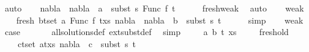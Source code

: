 \begin{isabellebody}
\ auto\isanewline
\ \ \isamarkupfalse%
\ {\isachardoublequoteopen}{\isacharparenleft}{\kern0pt}nabla{}\ {\isasymunion}\ nabla{}{\isacharparenright}{\kern0pt}\ {\isasymturnstile}\ a\ {\isasymsharp}\ subst\ s{}\ {\isacharparenleft}{\kern0pt}Func\ f\ t{\isacharprime}{\kern0pt}{\isacharparenright}{\kern0pt}{\isachardoublequoteclose}\isanewline
\ \ \ \ \isamarkupfalse%
\ fresh{\isacharunderscore}{\kern0pt}weak\ \isamarkupfalse%
\ auto\isanewline
\ \ \isamarkupfalse%
\ weak{}\isanewline
\ \ \isamarkupfalse%
\ fresh{\isacharcolon}{\kern0pt}\ {\isachardoublequoteopen}{\isasymforall}{\isacharparenleft}{\kern0pt}b{\isacharcomma}{\kern0pt}t{\isacharparenright}{\kern0pt}{\isasymin}set\ {\isacharparenleft}{\kern0pt}{\isacharparenleft}{\kern0pt}a{\isacharcomma}{\kern0pt}\ Func\ f\ t{\isacharprime}{\kern0pt}{\isacharparenright}{\kern0pt}{\isacharhash}{\kern0pt}xs{\isacharparenright}{\kern0pt}{\isachardot}{\kern0pt}\ {\isacharparenleft}{\kern0pt}nabla{}\ {\isasymunion}\ nabla{}{\isacharparenright}{\kern0pt}\ {\isasymturnstile}\ b\ {\isasymsharp}\ subst\ s{}\ t{\isachardoublequoteclose}\isanewline
\ \ \ \ \isamarkupfalse%
\ simp\isanewline
\ \ \isamarkupfalse%
\ weak{}{\isacharparenleft}{\kern0pt}{}{\isacharparenright}{\kern0pt}\ \isamarkupfalse%
\ {\isacharquery}{\kern0pt}case\ \isanewline
\ \ \ \ \isamarkupfalse%
\ all{\isacharunderscore}{\kern0pt}solutions{\isacharunderscore}{\kern0pt}def\ ext{\isacharunderscore}{\kern0pt}subst{\isacharunderscore}{\kern0pt}def\ \isamarkupfalse%
\ simp\isanewline
{}\isamarkupfalse%
\isanewline
\ \ \isamarkupfalse%
\ {\isacharparenleft}{\kern0pt}{}\ a\ b\ t{\isacharprime}{\kern0pt}\ xs{\isacharparenright}{\kern0pt}\isanewline
\ \ \ \isamarkupfalse%
\ fresh{\isacharunderscore}{\kern0pt}old{\isacharcolon}{\kern0pt}\isanewline
\ \ \ \ {\isachardoublequoteopen}{\isasymforall}{\isacharparenleft}{\kern0pt}c{\isacharcomma}{\kern0pt}t{\isacharparenright}{\kern0pt}{\isasymin}set\ {\isacharparenleft}{\kern0pt}{\isacharparenleft}{\kern0pt}a{\isacharcomma}{\kern0pt}t{\isacharprime}{\kern0pt}{\isacharparenright}{\kern0pt}{\isacharhash}{\kern0pt}xs{\isacharparenright}{\kern0pt}{\isachardot}{\kern0pt}\ nabla{}\ {\isasymturnstile}\ c\ {\isasymsharp}\ subst\ s{}\ t{\isachardoublequoteclose}\isanewline

\end{isabellebody}
